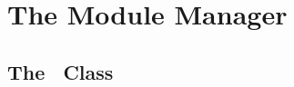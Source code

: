 %
%
% 
% 
% 
% 
% 

%
%

\chapter{The Module Manager}
\label{sec:modulemanager}

\section{The \Module\ Class}

